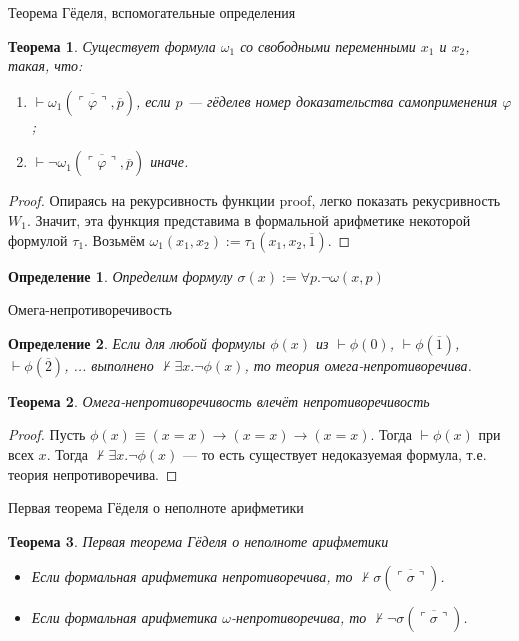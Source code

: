 \documentclass[aspectratio=169]{beamer}
\newtheorem{thm}{Теорема}[section]
\newtheorem{dfn}{Определение}[section]
\begin{document}
\begin{frame}{Теорема Гёделя, вспомогательные определения}
\begin{thm}Существует формула $\omega_1$ со свободными переменными $x_1$ и $x_2$,
такая, что:
\begin{enumerate}
\item $\vdash \omega_1(\overline{\ulcorner \varphi \urcorner},\overline{p})$, если $p$ --- гёделев номер
доказательства самоприменения $\varphi$;
\item $\vdash \neg\omega_1(\overline{\ulcorner \varphi \urcorner},\overline{p})$ иначе.
\end{enumerate}
\end{thm}
\begin{proof}Опираясь на рекурсивность функции proof, легко показать рекусривность $W_1$.
Значит, эта функция представима в формальной арифметике некоторой формулой $\tau_1$.
Возьмём $\omega_1(x_1,x_2) := \tau_1(x_1,x_2,\overline{1})$.
\end{proof}

\begin{dfn}
Определим формулу $\sigma(x) := \forall p.\neg\omega(x,p)$
\end{dfn}
\end{frame}

\begin{frame}{Омега-непротиворечивость}
\begin{dfn}Если для любой формулы $\phi(x)$ из $\vdash\phi(0)$, $\vdash\phi(\overline{1})$,
$\vdash\phi(\overline{2})$, ... выполнено $\not\vdash\exists x.\neg\phi(x)$, 
то теория \emph{омега-непротиворечива}.
\end{dfn}
\begin{thm}Омега-непротиворечивость влечёт непротиворечивость\end{thm}
\begin{proof}Пусть $\phi(x) \equiv (x=x)\rightarrow(x=x)\rightarrow(x=x)$. Тогда $\vdash\phi(x)$ при всех $x$.
Тогда $\not\vdash\exists x.\neg\phi(x)$ --- то есть существует недоказуемая формула, т.е. теория непротиворечива.
\end{proof}
\end{frame}

\begin{frame}{Первая теорема Гёделя о неполноте арифметики}

\begin{thm}{Первая теорема Гёделя о неполноте арифметики}
\begin{itemize}
\item Если формальная арифметика непротиворечива, то $\not\vdash\sigma(\overline{\ulcorner\sigma\urcorner})$.
\item Если формальная арифметика $\omega$-непротиворечива, то $\not\vdash\neg\sigma(\overline{\ulcorner\sigma\urcorner})$.
\end{itemize}
\end{thm}
\end{frame}
\end{document}
